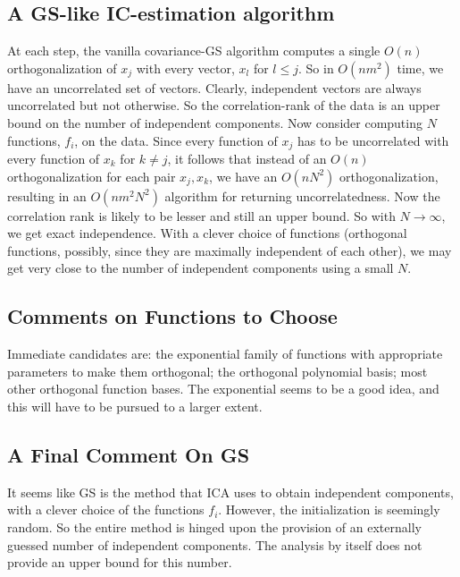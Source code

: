 \documentclass[reqno]{amsart}
\begin{document}
\subsection{A GS-like IC-estimation algorithm}
At each step, the vanilla covariance-GS algorithm computes a single $O(n)$ orthogonalization of $x_j$ with every vector, $x_l$ for $l \leq j$. So in $O(n m^2)$ time, we have an uncorrelated set of vectors. Clearly, independent vectors are always uncorrelated but not otherwise. So the correlation-rank of the data is an upper bound on the number of independent components. Now consider computing $N$ functions, $f_i$, on the data. Since every function of $x_j$ has to be uncorrelated with every function of $x_k$ for $k \neq j$, it follows that instead of an $O(n)$ orthogonalization for each pair $x_j, x_k$, we have an $O(nN^2)$ orthogonalization, resulting in an $O(n m^2 N^2)$ algorithm for returning uncorrelatedness. Now the correlation rank is likely to be lesser and still an upper bound. So with $N \to \infty$, we get exact independence. With a clever choice of functions (orthogonal functions, possibly, since they are maximally independent of each other), we may get very close to the number of independent components using a small $N$.

\subsection{Comments on Functions to Choose}
Immediate candidates are: the exponential family of functions with appropriate parameters to make them orthogonal; the orthogonal polynomial basis; most other orthogonal function bases. The exponential seems to be a good idea, and this will have to be pursued to a larger extent.

\subsection{A Final Comment On GS}
It seems like GS is the method that ICA uses to obtain independent components, with a clever choice of the functions $f_i$. However, the initialization is seemingly random. So the entire method is hinged upon the provision of an externally guessed number of independent components. The analysis by itself does not provide an upper bound for this number. 
\end{document}
